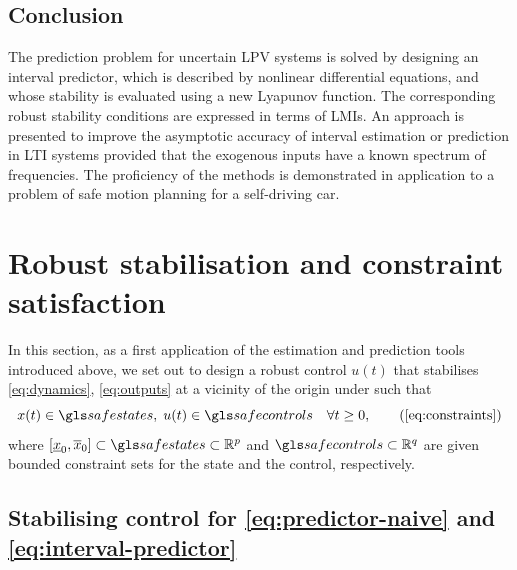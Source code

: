 \subsection*{Conclusion}

The prediction problem for uncertain \gls{LPV} systems is solved by designing an interval predictor, which is described by nonlinear differential equations, and whose stability is evaluated using a new Lyapunov function. The corresponding robust stability conditions are expressed in terms of \glspl{LMI}. An approach is presented to improve the asymptotic accuracy of interval estimation or prediction in \gls{LTI} systems provided that the exogenous inputs have a known spectrum of frequencies. The proficiency of the methods is demonstrated in application to a problem of safe motion planning for a self-driving car.



\section{Robust stabilisation and constraint satisfaction}
\label{sec:robust-stabilisation}

In this section, as a first application of the estimation and prediction tools introduced above, we set out to design a robust control $u(t)$ that stabilises \eqref{eq:dynamics}, \eqref{eq:outputs} at a vicinity of the origin under 
such that
\begin{equation}
x(t)\in\safestates,\;u(t)\in\safecontrols\quad\forall t\geq0,\tag{\ref{eq:constraints}}
\end{equation}
where $[\underline{x}_{0},\overline{x}_{0}]\subset\safestates\subset\Real^{p}$ and $\safecontrols\subset\Real^{q}$ are given bounded constraint sets for the state and the control, respectively.

\subsection{Stabilising control for \eqref{eq:predictor-naive} and \eqref{eq:interval-predictor}}

